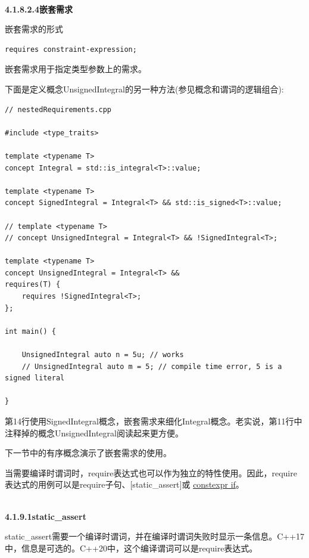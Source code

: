 \hspace*{\fill} \\ %
\noindent
\textbf{4.1.8.2.4\hspace{0.2cm}嵌套需求}

嵌套需求的形式

\begin{lstlisting}[style=styleCXX]
requires constraint-expression;
\end{lstlisting}

嵌套需求用于指定类型参数上的需求。

下面是定义概念UnsignedIntegral的另一种方法(参见概念和谓词的逻辑组合):

\begin{lstlisting}[style=styleCXX]
// nestedRequirements.cpp

#include <type_traits>

template <typename T>
concept Integral = std::is_integral<T>::value;

template <typename T>
concept SignedIntegral = Integral<T> && std::is_signed<T>::value;

// template <typename T>
// concept UnsignedIntegral = Integral<T> && !SignedIntegral<T>;

template <typename T>
concept UnsignedIntegral = Integral<T> &&
requires(T) {
	requires !SignedIntegral<T>;
};

int main() {

	UnsignedIntegral auto n = 5u; // works
	// UnsignedIntegral auto m = 5; // compile time error, 5 is a signed literal

}
\end{lstlisting}

第14行使用SignedIntegral概念，嵌套需求来细化Integral概念。老实说，第11行中注释掉的概念UnsignedIntegral阅读起来更方便。

下一节中的有序概念演示了嵌套需求的使用。


当需要编译时谓词时，require表达式也可以作为独立的特性使用。因此，require表达式的用例可以是require子句、[static\_assert]或 \href{https://en.cppreference.com/w/cpp/language/if}{constexpr if}。

\hspace*{\fill} \\ %
\noindent
\textbf{4.1.9.1\hspace{0.2cm}static\_assert}

static\_assert需要一个编译时谓词，并在编译时谓词失败时显示一条信息。C++17中，信息是可选的。C++20中，这个编译谓词可以是require表达式。

